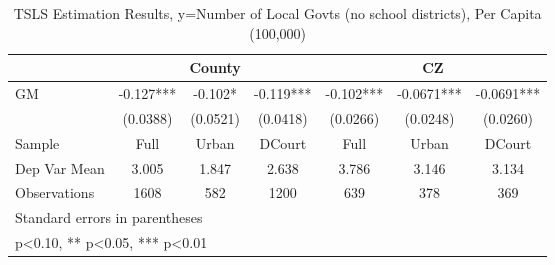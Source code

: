 \begin{table}[htbp]\centering
\def\sym#1{\ifmmode^{#1}\else\(^{#1}\)\fi}
\caption{TSLS Estimation Results, y=Number of Local Govts (no school districts), Per Capita (100,000)}
\begin{tabular}{l*{6}{c}}
\toprule
                &\multicolumn{3}{c}{County}            &\multicolumn{3}{c}{CZ}                \\\cmidrule(lr){2-4}\cmidrule(lr){5-7}
\midrule
GM              &   -0.127***&   -0.102*  &   -0.119***&   -0.102***&  -0.0671***&  -0.0691***\\
                & (0.0388)   & (0.0521)   & (0.0418)   & (0.0266)   & (0.0248)   & (0.0260)   \\
\midrule
Sample          &     Full   &    Urban   &   DCourt   &     Full   &    Urban   &   DCourt   \\
Dep Var Mean    &    3.005   &    1.847   &    2.638   &    3.786   &    3.146   &    3.134   \\
Observations    &     1608   &      582   &     1200   &      639   &      378   &      369   \\
\bottomrule
\multicolumn{7}{l}{\footnotesize Standard errors in parentheses}\\
\multicolumn{7}{l}{\footnotesize * p<0.10, ** p<0.05, *** p<0.01}\\
\end{tabular}
\end{table}
